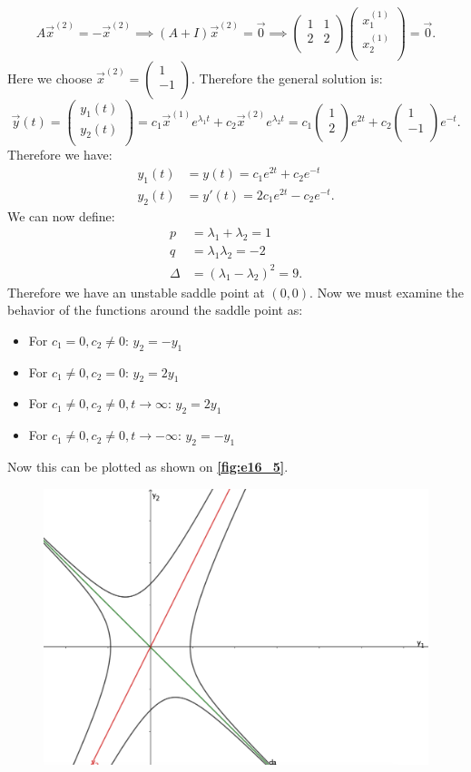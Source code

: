 \[ 
A \Vec{x}^{(2)} = - \Vec{x}^{(2)} \implies \left( A + I \right) \Vec{x}^{(2)} = \Vec{0} \implies \begin{pmatrix}
  1 & 1\\
  2 & 2\\
\end{pmatrix} \begin{pmatrix}
x_1^{(1)}\\
x_2^{(1)}\\
\end{pmatrix} = \Vec{0}
.\]
Here we choose $\Vec{x}^{(2)} = \begin{pmatrix}
1\\
-1\\
\end{pmatrix}$. Therefore the general solution is:
\[ 
\Vec{y}(t) = \begin{pmatrix}
y_1(t)\\
y_2(t)\\
\end{pmatrix} = c_1 \Vec{x}^{(1)} e^{\lambda_1 t} + c_2 \Vec{x}^{(2)} e^{\lambda_2 t} = c_1 \begin{pmatrix}
1\\
2\\
\end{pmatrix} e^{2t} + c_2 \begin{pmatrix}
1\\
-1\\
\end{pmatrix} e^{-t}
.\]
Therefore we have:
\begin{align*}
  y_1(t) &= y(t) = c_1 e^{2t} + c_2 e^{-t} \\
  y_2(t) &= y'(t) = 2c_1 e^{2t} - c_2 e^{-t}
.\end{align*}
We can now define:
\begin{align*}
  p &= \lambda_1 + \lambda_2 = 1 \\
  q &= \lambda_1 \lambda_2 = -2 \\
  \Delta &= \left( \lambda_1 - \lambda_2 \right)^2 = 9
.\end{align*}
Therefore we have an unstable saddle point at $\left( 0,0 \right) $. Now we must examine the behavior of the functions around the saddle point as:
\begin{itemize}
  \item For $c_1 = 0, c_2 \neq 0$: $y_2 = -y_1$
  \item For $c_1 \neq 0, c_2 = 0$: $y_2 = 2y_1$
  \item For $c_1 \neq 0, c_2 \neq 0, t \to \infty$: $y_2 = 2y_1$
  \item For $c_1 \neq 0, c_2 \neq 0, t \to -\infty$: $y_2 = - y_1$
\end{itemize}
Now this can be plotted as shown on \textbf{\autoref{fig:e16_5}}.
\begin{figure} [ht]
  \centering
  \includegraphics[width=0.5\linewidth]{./figures/e16_5.png}
  \caption{}
  \label{fig:e16_5}
\end{figure}
